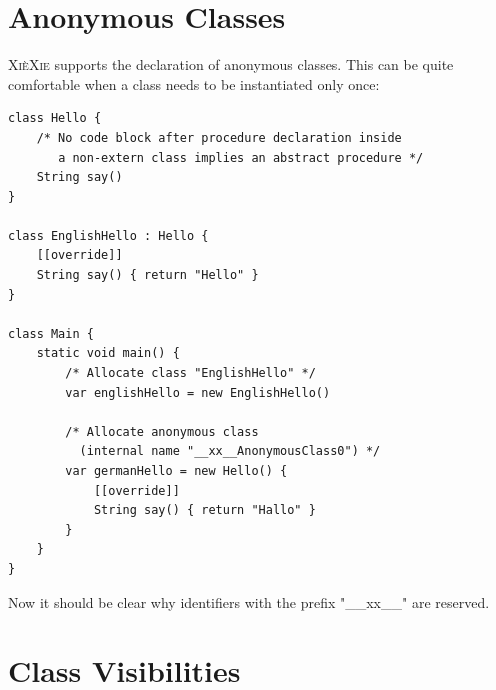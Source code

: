 \documentclass[a5paper]{report}
\def\xiexie{\textsc{Xi\`eXie}\xspace}
\begin{document}
\section{Anonymous Classes}

\xiexie supports the declaration of anonymous classes. This can be quite comfortable when a class needs to be
instantiated only once:
\begin{lstlisting}
class Hello {
    /* No code block after procedure declaration inside 
       a non-extern class implies an abstract procedure */
    String say()
}

class EnglishHello : Hello {
    [[override]]
    String say() { return "Hello" }
}

class Main {
    static void main() {
        /* Allocate class "EnglishHello" */
        var englishHello = new EnglishHello()
        
        /* Allocate anonymous class
          (internal name "__xx__AnonymousClass0") */
        var germanHello = new Hello() {
            [[override]]
            String say() { return "Hallo" }
        }
    }
}
\end{lstlisting}
Now it should be clear why identifiers with the prefix "\_\_xx\_\_" are reserved.



\section{Class Visibilities}
\end{document}
